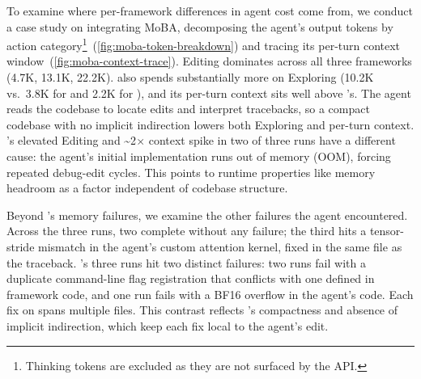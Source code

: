 To examine where per-framework differences in agent cost come from,
we conduct a case study on integrating MoBA, decomposing the
agent's output tokens by action
category\footnote{Thinking tokens are excluded as they are not
surfaced by the API.}~(\autoref{fig:moba-token-breakdown}) and
tracing its per-turn context
window~(\autoref{fig:moba-context-trace}). Editing dominates
across all three frameworks (\sys 4.7K, \megatron 13.1K,
\torchtitan 22.2K). \megatron also spends substantially more on
Exploring (10.2K vs.\ 3.8K for \torchtitan and 2.2K for \sys),
and its per-turn context sits well above \sys's. The agent reads
the codebase to locate edits and interpret tracebacks, so a
compact codebase with no implicit indirection lowers both
Exploring and per-turn context. \torchtitan's elevated Editing
and \textasciitilde2$\times$ context spike in two of three runs have a different
cause: the agent's initial implementation runs out of memory
(OOM), forcing repeated debug-edit cycles. This points to runtime
properties like memory headroom as a factor independent of
codebase structure.

Beyond \torchtitan's memory failures, we examine the other
failures the agent encountered. Across the three \sys runs, two
complete without any failure; the third hits a tensor-stride
mismatch in the agent's custom attention kernel, fixed in the same
file as the traceback. \megatron's three runs hit two distinct failures: two runs fail
with a duplicate command-line flag registration that conflicts with
one defined in framework code, and one run fails with a BF16
overflow in the agent's code. Each fix on \megatron spans multiple
files. This
contrast reflects \sys's compactness and absence of implicit
indirection, which keep each fix local to the agent's edit.




